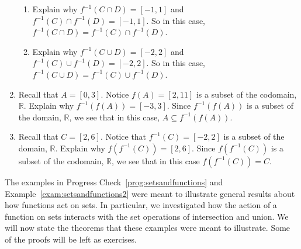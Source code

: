 \begin{example}
\begin{enumerate}
\begin{enumerate}
\item Explain why $f^{-1} ( C \cap D ) = [-1, 1]$ and 
$f^{-1} ( C ) \cap f^{-1} ( D ) = [-1, 1]$.  So in this case,
$f^{-1} ( C \cap D ) = f^{-1} ( C ) \cap f^{-1} ( D )$.

\item Explain why $f^{-1} ( C \cup D ) = [-2, 2]$ and 
$f^{-1} ( C ) \cup f^{-1} ( D ) = [-2, 2]$.  So in this case, 
$f^{-1} ( C \cup D ) = f^{-1} ( C ) \cup f^{-1} ( D )$.
\end{enumerate}

\item Recall that $A = [0, 3]$.  Notice $f ( A ) = [2, 11]$ is a subset of the codomain, $\mathbb{R}$. Explain why $f^{-1} \!\left( f ( A ) \right) = [-3, 3]$.  Since  
$f^{-1} \!\left( f ( A ) \right)$ is a subset of the domain, 
$\mathbb{R}$, we see that in this case, 
$A \subseteq f^{-1} \!\left( f ( A ) \right)$.

\item Recall that $C = [2, 6]$.  Notice that $f^{-1} ( C ) = [-2, 2]$ is a subset of the domain, 
$\mathbb{R}$.  Explain why $f \!\left( f^{-1} ( C ) \right) = [2, 6]$.  Since 
$f \!\left( f^{-1} ( C ) \right)$ is a subset of the codomain, 
$\mathbb{R}$, we see that in this case $f \!\left( f^{-1} ( C ) \right) = C$.
\end{enumerate}
\end{example}
\hbreak

The examples in Progress Check~\ref{prog:setsandfunctions} and 
Example~\ref{exam:setsandfunctions2} were meant to illustrate general results about how functions act on sets.  In particular, we investigated how the action of a function on sets interacts with the set operations of intersection and union.  We will now state the theorems that these examples were meant to illustrate.  Some of the proofs will be left as exercises.

